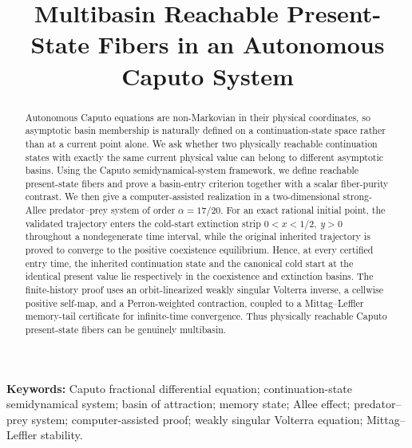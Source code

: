 \title{Multibasin Reachable Present-State Fibers in an Autonomous Caputo System}

\author{}

\date{}

\maketitle

\begin{abstract}
Autonomous Caputo equations are non-Markovian in their physical coordinates, so asymptotic basin membership is naturally defined on a continuation-state space rather than at a current point alone. We ask whether two physically reachable continuation states with exactly the same current physical value can belong to different asymptotic basins. Using the Caputo semidynamical-system framework, we define reachable present-state fibers and prove a basin-entry criterion together with a scalar fiber-purity contrast. We then give a computer-assisted realization in a two-dimensional strong-Allee predator--prey system of order \(\alpha=17/20\). For an exact rational initial point, the validated trajectory enters the cold-start extinction strip \(0<x<1/2,\ y>0\) throughout a nondegenerate time interval, while the original inherited trajectory is proved to converge to the positive coexistence equilibrium. Hence, at every certified entry time, the inherited continuation state and the canonical cold start at the identical present value lie respectively in the coexistence and extinction basins. The finite-history proof uses an orbit-linearized weakly singular Volterra inverse, a cellwise positive self-map, and a Perron-weighted contraction, coupled to a Mittag--Leffler memory-tail certificate for infinite-time convergence. Thus physically reachable Caputo present-state fibers can be genuinely multibasin.
\end{abstract}

\noindent\textbf{Keywords:}
Caputo fractional differential equation;
continuation-state semidynamical system;
basin of attraction;
memory state;
Allee effect;
predator--prey system;
computer-assisted proof;
weakly singular Volterra equation;
Mittag--Leffler stability.
